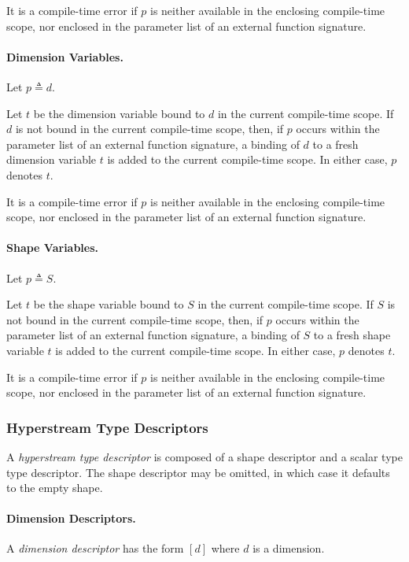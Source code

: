 \documentclass{article}
\begin{document}
 It is a compile-time error if $p$ is neither available in the enclosing compile-time scope, nor enclosed in the parameter list of an external function signature.
 
 \paragraph{Dimension Variables.}
 
 Let $p \triangleq d$.
 
 Let $t$ be the dimension variable bound to $d$ in the current compile-time scope. If $d$ is not bound in the current compile-time scope, then, if $p$ occurs within the parameter list of an external function signature,  a binding of $d$ to a fresh dimension variable $t$ is added to the current compile-time scope. In either case, $p$ denotes  $t$. 

 
 It is a compile-time error if $p$ is neither available in the enclosing compile-time scope, nor enclosed in the parameter list of an external function signature.
 
 \paragraph{Shape Variables.}


 Let $p \triangleq S$.
 
 Let $t$ be the shape variable bound to  $S$ in the current compile-time scope. If $S$ is not bound in the current compile-time scope, then, if $p$ occurs within the parameter list of an external function signature,  a binding of  $S$ to a fresh shape variable $t$ is added to the current compile-time scope. In either case, $p$ denotes  $t$. 
 
 It is a compile-time error if $p$ is neither available in the enclosing compile-time scope, nor enclosed in the parameter list of an external function signature.
 
\subsubsection{Hyperstream Type Descriptors}
\label{hyperstreamTypeDescriptors}

A {\em hyperstream type descriptor} is composed of a shape descriptor and a scalar type type descriptor. The shape descriptor may be omitted, in which case it defaults to the empty shape. 

\TypeSig{}
\HyperstreamType

\paragraph{Dimension Descriptors.}
A {\em dimension descriptor} has the form $[d]$ where $d$ is a dimension. 
\end{document}
